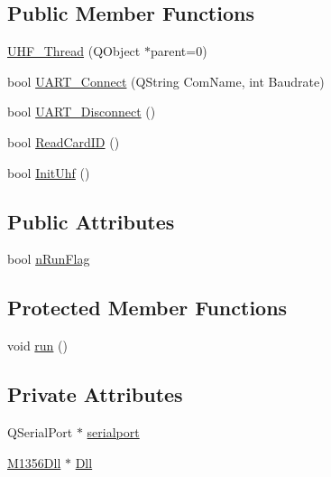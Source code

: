\subsection*{Public Member Functions}
\begin{DoxyCompactItemize}
\item 
\mbox{\hyperlink{class_u_h_f___thread_a4e345d08f3f78642458925017371cac2}{U\+H\+F\+\_\+\+Thread}} (Q\+Object $\ast$parent=0)
\item 
bool \mbox{\hyperlink{class_u_h_f___thread_a8a872370902a9eb489a836ab28d8044c}{U\+A\+R\+T\+\_\+\+Connect}} (Q\+String Com\+Name, int Baudrate)
\item 
bool \mbox{\hyperlink{class_u_h_f___thread_a4d29770cacd38ec97148b8642df794b8}{U\+A\+R\+T\+\_\+\+Disconnect}} ()
\item 
bool \mbox{\hyperlink{class_u_h_f___thread_a6dcb8fe026e47d35c7d992b860c86492}{Read\+Card\+ID}} ()
\item 
bool \mbox{\hyperlink{class_u_h_f___thread_a0bb3c8d9ac1290986ce318819dc4ecbf}{Init\+Uhf}} ()
\end{DoxyCompactItemize}
\subsection*{Public Attributes}
\begin{DoxyCompactItemize}
\item 
bool \mbox{\hyperlink{class_u_h_f___thread_ab40811b93c5e8b31c4f40cc79139e504}{n\+Run\+Flag}}
\end{DoxyCompactItemize}
\subsection*{Protected Member Functions}
\begin{DoxyCompactItemize}
\item 
void \mbox{\hyperlink{class_u_h_f___thread_a7ae2a5c0bae9b20e0fbc315febefb818}{run}} ()
\end{DoxyCompactItemize}
\subsection*{Private Attributes}
\begin{DoxyCompactItemize}
\item 
Q\+Serial\+Port $\ast$ \mbox{\hyperlink{class_u_h_f___thread_a20904e9764b311fdb015c3fd6cbec497}{serialport}}
\item 
\mbox{\hyperlink{class_m1356_dll}{M1356\+Dll}} $\ast$ \mbox{\hyperlink{class_u_h_f___thread_a64b7885c54cd1b820beb220461e9d04a}{Dll}}
\end{DoxyCompactItemize}


